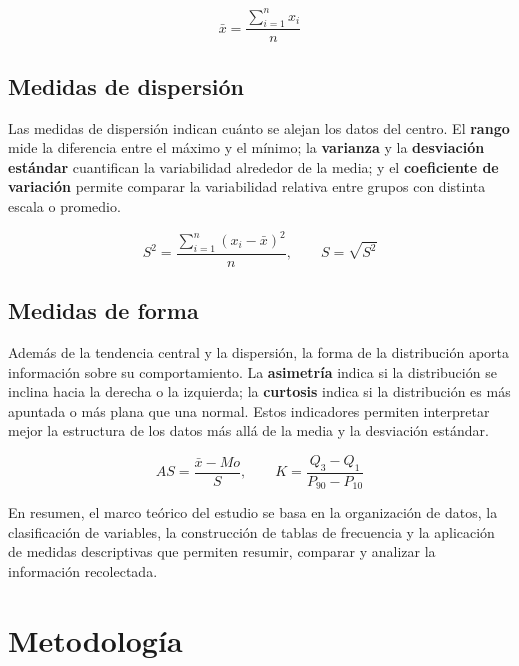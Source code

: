\documentclass[12pt,letterpaper]{article}
\begin{document}
\begin{equation}
\bar{x} = \frac{\sum_{i=1}^{n} x_i}{n}
\end{equation}

\subsection{Medidas de dispersión}

Las medidas de dispersión indican cuánto se alejan los datos del centro. El \textbf{rango} mide la diferencia entre el máximo y el mínimo; la \textbf{varianza} y la \textbf{desviación estándar} cuantifican la variabilidad alrededor de la media; y el \textbf{coeficiente de variación} permite comparar la variabilidad relativa entre grupos con distinta escala o promedio.

\begin{equation}
S^2 = \frac{\sum_{i=1}^{n}(x_i - \bar{x})^2}{n}, \qquad S = \sqrt{S^2}
\end{equation}

\subsection{Medidas de forma}

Además de la tendencia central y la dispersión, la forma de la distribución aporta información sobre su comportamiento. La \textbf{asimetría} indica si la distribución se inclina hacia la derecha o la izquierda; la \textbf{curtosis} indica si la distribución es más apuntada o más plana que una normal. Estos indicadores permiten interpretar mejor la estructura de los datos más allá de la media y la desviación estándar.

\begin{equation}
AS = \frac{\bar{x} - Mo}{S}, \qquad K = \frac{Q_3 - Q_1}{P_{90} - P_{10}}
\end{equation}

En resumen, el marco teórico del estudio se basa en la organización de datos, la clasificación de variables, la construcción de tablas de frecuencia y la aplicación de medidas descriptivas que permiten resumir, comparar y analizar la información recolectada.

\section{Metodología}
\end{document}

